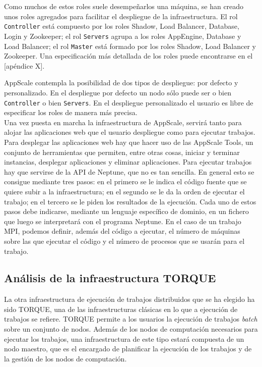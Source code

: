 Como muchos de estos roles suele desempeñarlos una máquina, se han creado unos roles agregados para facilitar el despliegue de la infraestructura. El rol \texttt{Controller} está compuesto por los roles Shadow, Load Balancer, Database, Login y Zookeeper; el rol \texttt{Servers} agrupa a los roles AppEngine, Database y Load Balancer; el rol \texttt{Master} está formado por los roles Shadow, Load Balancer y Zookeeper. Una especificación más detallada de los roles puede encontrarse en el [apéndice X].

AppScale contempla la posibilidad de dos tipos de despliegue: por defecto y personalizado. En el despliegue por defecto un nodo sólo puede ser o bien \texttt{Controller} o bien \texttt{Servers}. En el despliegue personalizado el usuario es libre de especificar los roles de manera más precisa. \\

Una vez puesta en marcha la infraestructura de AppScale, servirá tanto para alojar las aplicaciones web que el usuario despliegue como para ejecutar trabajos. Para desplegar las aplicaciones web hay que hacer uso de las AppScale Tools, un conjunto de herramientas que permiten, entre otras cosas, iniciar y terminar instancias, desplegar aplicaciones y eliminar aplicaciones. Para ejecutar trabajos hay que servirse de la API de Neptune, que no es tan sencilla. En general esto se consigue mediante tres pasos: en el primero se le indica el código fuente que se quiere subir a la infraestructura; en el segundo se le da la orden de ejecutar el trabajo; en el tercero se le piden los resultados de la ejecución. Cada uno de estos pasos debe indicarse, mediante un lenguaje específico de dominio, en un fichero que luego se interpretará con el programa Neptune. En el caso de un trabajo MPI, podemos definir, además del código a ejecutar, el número de máquinas sobre las que ejecutar el código y el número de procesos que se usarán para el trabajo.


\subsection{Análisis de la infraestructura TORQUE}

La otra infraestructura de ejecución de trabajos distribuidos que se ha elegido ha sido TORQUE, una de las infraestructuras clásicas en lo que a ejecución de trabajos se refiere. TORQUE permite a los usuarios la ejecución de trabajos \emph{batch} sobre un conjunto de nodos. Además de los nodos de computación necesarios para ejecutar los trabajos, una infraestructura de este tipo estará compuesta de un nodo maestro, que es el encargado de planificar la ejecución de los trabajos y de la gestión de los nodos de computación. \\

